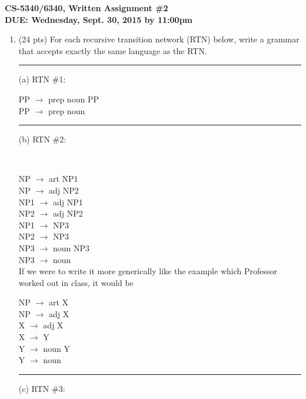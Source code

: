 \documentclass[11pt]{article}
\begin{document}
\large
\begin{center}
{\bf CS-5340/6340, Written Assignment \#2} \\
{\bf DUE: Wednesday, Sept. 30, 2015 by 11:00pm}
\end{center}
\normalsize

\begin{enumerate}  

\item (24 pts) For each recursive transition network (RTN) below,
  write a grammar that accepts exactly the same language as the
  RTN. \\ 
  


\hrule
(a) RTN \#1: 
\begin{center}
\end{center}

  PP $\rightarrow$ prep noun PP \\
  PP $\rightarrow$ prep noun\\
	
\hrule 
(b) RTN \#2: 
\begin{center}
~ 
\end{center}

NP $\rightarrow$  art NP1\\
NP $\rightarrow$  adj NP2\\
NP1 $\rightarrow$  adj NP1\\
NP2  $\rightarrow$  adj NP2 \\
NP1 $\rightarrow$ NP3\\
NP2 $\rightarrow$ NP3\\
NP3 $\rightarrow$ noun NP3\\
NP3 $\rightarrow$  noun\\

If we were to write it more generically like the example which Professor worked out in class, it would be 

NP $\rightarrow$  art X\\
NP $\rightarrow$  adj X\\
X $\rightarrow$  adj X\\
X $\rightarrow$ Y\\
Y $\rightarrow$ noun Y\\
Y $\rightarrow$  noun\\


\hrule
(c) RTN \#3: 
\begin{center}
\end{center}


\end{enumerate}
\end{document}
